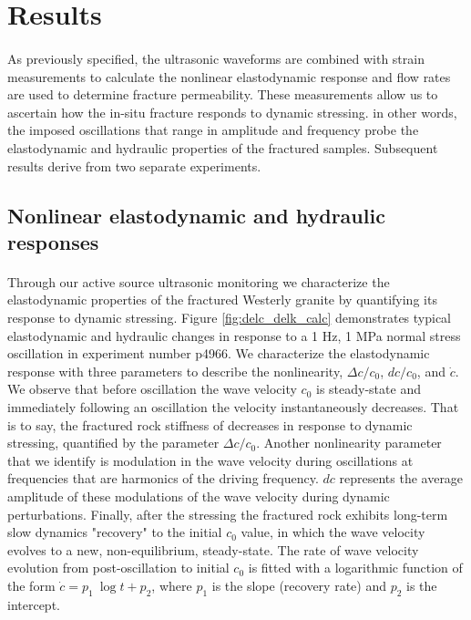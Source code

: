 \documentclass[letterpaper,10pt]{article}
\begin{document}
\newpage



\section{Results}
\paragraph{}
As previously specified, the ultrasonic waveforms are combined with strain measurements to calculate the nonlinear elastodynamic response and flow rates are used to determine fracture permeability. These measurements allow us to ascertain how the in-situ fracture responds to dynamic stressing. in other words, the imposed oscillations that range in amplitude and frequency probe the elastodynamic and hydraulic properties of the fractured samples. Subsequent results derive from two separate experiments. 

\subsection{Nonlinear elastodynamic and hydraulic responses}
\paragraph{}
Through our active source ultrasonic monitoring we characterize the elastodynamic properties of the fractured Westerly granite by quantifying its response to dynamic stressing. Figure \ref{fig:delc_delk_calc} demonstrates typical elastodynamic and hydraulic changes in response to a 1 Hz, 1 MPa normal stress oscillation in experiment number p4966. We characterize the elastodynamic response with three parameters to describe the nonlinearity, $ \Delta c/c_0 $, $ dc/c_0 $, and $ \dot c $. We observe that before oscillation the wave velocity $ c_0 $ is steady-state and immediately following an oscillation the velocity instantaneously decreases. That is to say, the fractured rock stiffness of decreases in response to dynamic stressing, quantified by the parameter $ \Delta c/c_0 $. 
Another nonlinearity parameter that we identify is modulation in the wave velocity during oscillations at frequencies that are harmonics of the driving frequency. $ dc $ represents the average amplitude of these modulations of the wave velocity during dynamic perturbations. Finally, after the stressing the fractured rock exhibits long-term slow dynamics "recovery" to the initial $ c_0 $ value, in which the wave velocity evolves to a new, non-equilibrium, steady-state. The rate of wave velocity evolution from post-oscillation to initial $ c_0 $ is fitted with a logarithmic function of the form $ \dot c = p_1\ \log{t} + p_2 $, where $p_1$ is the slope (recovery rate) and $p_2$ is the intercept.
\end{document}
